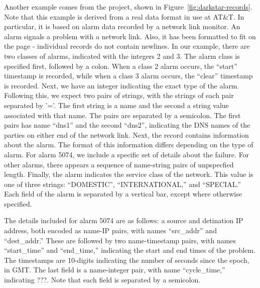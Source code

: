 \documentclass{entcs}
\begin{document}
Another example comes from the \darkstar{} project, shown in
Figure~\ref{fig:darkstar-records}. Note that this example is derived
from a real data format in use at AT\&T. In particular, it is based on
alarm data recorded by a network link monitor. An alarm signals a
problem with a network link. Also, it has been formatted to fit on the
page - individual records do not contain newlines. In our example,
there are two classes of alarms, indicated with the integers 2 and 3.
The alarm class is specified first, followed by a colon. When a class
2 alarm occurs, the ``start'' timestamp is recorded, while when a
class 3 alarm occurs, the ``clear'' timestamp is recorded.  Next, we
have an integer indicating the exact type of the alarm.  Following
this, we expect two pairs of strings, with the strings of each pair
separated by '='. The first string is a name and the second a string
value associated with that name. The pairs are separated by a
semicolon.  The first pairs has name ``dns1'' and the second ``dns2'',
indicating the DNS names of the parties on either end of the network
link. Next, the record contains information about the alarm. The
format of this information differs depending on the type of alarm. For
alarm 5074, we include a specific set of details about the failure.
For other alarms, there appears a sequence of name-string pairs of
unpspecfied length.  Finally, the alarm indicates the service class of
the network. This value is one of three strings: ``DOMESTIC'',
``INTERNATIONAL,'' and ``SPECIAL.'' Each field of the alarm is
separated by a vertical bar, except where otherwise specified.

The details included for alarm 5074 are as follows: a source and
detination IP address, both encoded as name-IP pairs, with names
``src\_addr'' and ``dest\_addr.'' These are followed by two
name-timestamp pairs, with names ``start\_time'' and ``end\_time,''
indicating the start and end times of the problem. The timestamps are
10-digits indicating the number of seconds since the epoch, in
GMT. The last field is a name-integer pair, with name ``cycle\_time,''
indicating ???. Note that each field is separated by a semicolon.
\end{document}
